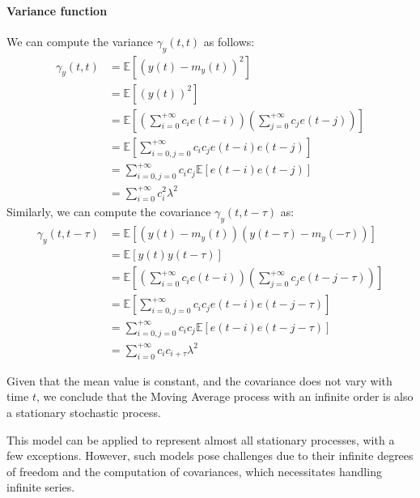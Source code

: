 \paragraph*{Variance function}
We can compute the variance $\gamma_y(t,t)$ as follows:
\begin{align*}
    \gamma_y(t,t)   &=\mathbb{E}\left[\left(y(t)-m_y(t)\right)^2\right] \\
                    &=\mathbb{E}\left[\left(y(t)\right)^2\right] \\
                    &=\mathbb{E}\left[\left(\sum_{i=0}^{+\infty}c_ie(t-i)\right)\left(\sum_{j=0}^{+\infty}c_je(t-j)\right)\right] \\
                    &=\mathbb{E}\left[\sum_{i=0,j=0}^{+\infty}c_ic_je(t-i)e(t-j)\right] \\
                    &=\sum_{i=0,j=0}^{+\infty}c_ic_j\mathbb{E}\left[e(t-i)e(t-j)\right] \\  
                    &=\sum_{i=0}^{+\infty}c_i^2\lambda^2
\end{align*}
Similarly, we can compute the covariance $\gamma_y(t,t-\tau)$ as:
\begin{align*}
    \gamma_y(t,t-\tau)  &=\mathbb{E}\left[\left(y(t)-m_y(t)\right)\left(y(t-\tau)-m_y(-\tau)\right)\right] \\
                        &=\mathbb{E}\left[y(t)y(t-\tau)\right] \\
                        &=\mathbb{E}\left[\left(\sum_{i=0}^{+\infty}c_ie(t-i)\right)\left(\sum_{j=0}^{+\infty}c_je(t-j-\tau)\right)\right] \\
                        &=\mathbb{E}\left[\sum_{i=0,j=0}^{+\infty}c_ic_je(t-i)e(t-j-\tau)\right] \\
                        &=\sum_{i=0,j=0}^{+\infty}c_ic_j\mathbb{E}\left[e(t-i)e(t-j-\tau)\right] \\  
                        &=\sum_{i=0}^{+\infty}c_ic_{i+\tau}\lambda^2
\end{align*}

Given that the mean value is constant, and the covariance does not vary with time $t$, we conclude that the Moving Average process with an infinite order is also a stationary stochastic process.

This model can be applied to represent almost all stationary processes, with a few exceptions.
However, such models pose challenges due to their infinite degrees of freedom and the computation of covariances, which necessitates handling infinite series.